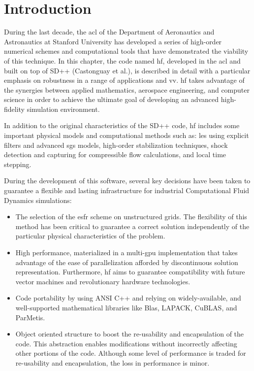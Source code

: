 
\section{Introduction}

During the last decade, the \gls{acl} of the Department of Aeronautics and Astronautics at Stanford University has developed a series of high-order numerical schemes and computational tools that have demonstrated the viability of this technique. In this chapter, the code named \gls{hf}, developed in the \gls{acl} and built on top of SD++ (Castonguay et al.\cite{castonguay2011}), is described in detail with a particular emphasis on robustness in a range of applications and \gls{vv}. \gls{hf} takes advantage of the synergies between applied mathematics, aerospace engineering, and computer science in order to achieve the ultimate goal of developing an advanced high-fidelity simulation environment.

In addition to the original characteristics of the SD++ code, \gls{hf} includes some important physical models and computational methods such as: \gls{les} using explicit filters and advanced \gls{sgs} models, high-order stabilization techniques, shock detection and capturing for compressible flow calculations, and local time stepping.

During the development of this software, several key decisions have been taken to guarantee a flexible and lasting infrastructure for industrial Computational Fluid Dynamics simulations:
\begin{itemize}
\item The selection of the \gls{esfr} scheme on unstructured grids\cite{vincent2011new}. The flexibility of this method has been critical to guarantee a correct solution independently of the particular physical characteristics of the problem.
\item High performance, materialized in a multi-\gls{gpu} implementation that takes advantage of the ease of parallelization afforded by discontinuous solution representation. Furthermore, \gls{hf} aims to guarantee compatibility with future vector machines and revolutionary hardware technologies.
\item Code portability by using ANSI C++ and relying on widely-available, and well-supported mathematical libraries like Blas, LAPACK, CuBLAS, and ParMetis.
\item Object oriented structure to boost the re-usability and encapsulation of the code. This abstraction enables modifications without incorrectly affecting other portions of the code. Although some level of performance is traded for re-usability and encapsulation, the loss in performance is minor.
\end{itemize}

